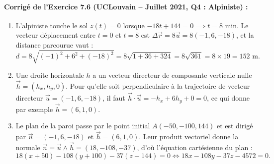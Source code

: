 \paragraph{Corrigé de l'Exercice 7.6 (UCLouvain -- Juillet 2021, Q4 : Alpiniste) :}
\begin{enumerate}[label=(\alph*)]
    \item L'alpiniste touche le sol $z(t) = 0$ lorsque $-18t + 144 = 0 \implies t = 8\text{ min}$. Le vecteur déplacement entre $t=0$ et $t=8$ est $\Delta\vec{r} = 8\vec{u} = 8(-1, 6, -18)$, et la distance parcourue vaut :
    \[
        d = 8\sqrt{(-1)^2 + 6^2 + (-18)^2} = 8\sqrt{1 + 36 + 324} = 8\sqrt{361} = 8 \times 19 = \boxed{152\text{ m}}.
    \]
    \item Une droite horizontale $h$ a un vecteur directeur de composante verticale nulle $\vec{h} = (h_x, h_y, 0)$. Pour qu'elle soit perpendiculaire à la trajectoire de vecteur directeur $\vec{u} = (-1, 6, -18)$, il faut $\vec{h} \cdot \vec{u} = -h_x + 6h_y + 0 = 0$, ce qui donne par exemple $\boxed{\vec{h} = (6, 1, 0)}$.
    \item Le plan de la paroi passe par le point initial $A(-50, -100, 144)$ et est dirigé par $\vec{u} = (-1, 6, -18)$ et $\vec{h} = (6, 1, 0)$. Leur produit vectoriel donne la normale $\vec{n} = \vec{u} \wedge \vec{h} = (18, -108, -37)$, d'où l'équation cartésienne du plan :
    \[
        \boxed{18(x + 50) - 108(y + 100) - 37(z - 144) = 0 \iff 18x - 108y - 37z - 4572 = 0}.
    \]
\end{enumerate}

